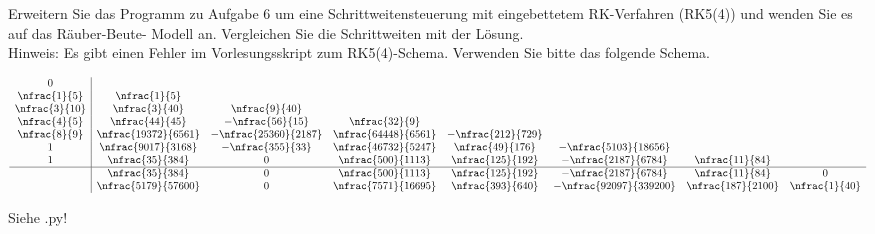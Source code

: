 \begin{exercise}
  Erweitern Sie das Programm zu Aufgabe $6$ um eine Schrittweitensteuerung mit
  eingebettetem RK-Verfahren (RK5(4)) und wenden Sie es auf das Räuber-Beute-
  Modell an. Vergleichen Sie die Schrittweiten mit der Lösung. \\

  Hinweis: Es gibt einen Fehler im Vorlesungsskript zum RK5(4)-Schema. Verwenden
  Sie bitte das folgende Schema.

  \begin{align*}
    \begin{array}{c|ccccccc}
    0 & & & & & & &                                                         \\
    \nfrac{1}{5} & \nfrac{1}{5} & & & & & &                                 \\
    \nfrac{3}{10} & \nfrac{3}{40} & \nfrac{9}{40} & & & & &                 \\
    \nfrac{4}{5} & \nfrac{44}{45} & -\nfrac{56}{15} & \nfrac{32}{9} & & & & \\
    \nfrac{8}{9} & \nfrac{19372}{6561} & -\nfrac{25360}{2187} &
    \nfrac{64448}{6561} & -\nfrac{212}{729} & & &                           \\
    1 & \nfrac{9017}{3168} & -\nfrac{355}{33} & \nfrac{46732}{5247} &
    \nfrac{49}{176} & -\nfrac{5103}{18656} & &                              \\
    1 & \nfrac{35}{384} & 0 & \nfrac{500}{1113} & \nfrac{125}{192} &
    -\nfrac{2187}{6784} & \nfrac{11}{84} &                                  \\
    \hline
     & \nfrac{35}{384} & 0 & \nfrac{500}{1113} & \nfrac{125}{192} &
    -\nfrac{2187}{6784} & \nfrac{11}{84} & 0                                \\
     & \nfrac{5179}{57600} & 0 & \nfrac{7571}{16695} & \nfrac{393}{640} &
     -\nfrac{92097}{339200} & \nfrac{187}{2100} & \nfrac{1}{40}
    \end{array}
  \end{align*}

\end{exercise}

\begin{solution}
  Siehe .py!
\end{solution}
